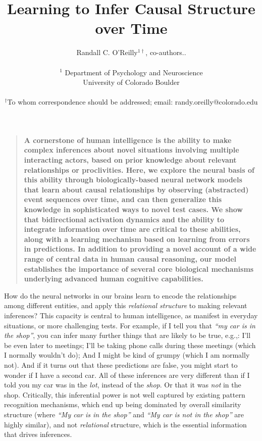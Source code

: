 \documentclass[11pt,twoside]{article}
\title{Learning to Infer Causal Structure over Time}
\author{
Randall C. O'Reilly$^{1\dagger}$, co-authors..\\
\\
\normalsize{$^{1}$  Department of Psychology and Neuroscience\\
  University of Colorado Boulder} \\
\\
\small{$^\dagger$To whom correspondence should be addressed;
  email: randy.oreilly@colorado.edu}\\
}
\date{}
\newif\myifpdf
\newenvironment{sciabstract}{%
\begin{quote} \bf}
{\end{quote}}
\begin{document}
\sloppy
\raggedbottom
\baselineskip20pt

\maketitle

\begin{sciabstract}
  A cornerstone of human intelligence is the ability to make complex inferences about novel situations involving multiple interacting actors, based on prior knowledge about relevant relationships or proclivities.  Here, we explore the neural basis of this ability through biologically-based neural network models that learn about causal relationships by observing (abstracted) event sequences over time, and can then generalize this knowledge in sophisticated ways to novel test cases.  We show that bidirectional activation dynamics and the ability to integrate information over time are critical to these abilities, along with a learning mechanism based on learning from errors in predictions.  In addition to providing a novel account of a wide range of central data in human causal reasoning, our model establishes the importance of several core biological mechanisms underlying advanced human cognitive capabilities.
\end{sciabstract}

\pagestyle{myheadings}

How do the neural networks in our brains learn to encode the relationships among different entities, and apply this {\em relational structure} to making relevant inferences?  This capacity is central to human intelligence, as manifest in everyday situations, or more challenging tests.  For example, if I tell you that {\em ``my car is in the shop''}, you can infer many further things that are likely to be true, e.g.,: I'll be even later to meetings; I'll be taking phone calls during these meetings (which I normally wouldn't do); And I might be kind of grumpy (which I am normally not).  And if it turns out that these predictions are false, you might start to wonder if I have a second car.  All of these inferences are very different than if I told you my car was in the {\em lot}, instead of the {\em shop}.  Or that it was {\em not} in the shop.  Critically, this inferential power is not well captured by existing pattern recognition mechanisms, which end up being dominated by overall similarity structure (where {\em ``My car is in the shop''} and {\em ``My car is not in the shop''} are highly similar), and not {\em relational} structure, which is the essential information that drives inferences.
\end{document}
